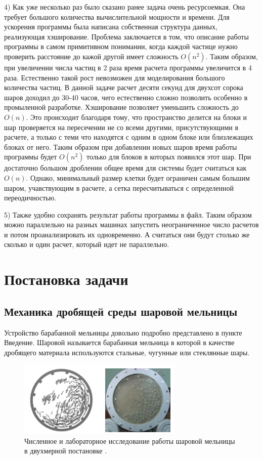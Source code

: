 \documentclass[utf8x, 14pt, oneside, a4paper]{article}
\begin{document}
4) Как уже несколько раз было сказано ранее задача очень ресурсоемкая.
Она требует большого количества вычислительной мощности и времени.
Для ускорения программы была написана собственная структура данных, реализующая хэширование.
Проблема заключается в том, что описание работы программы в самом примитивном понимании, когда каждой частице нужно проверить расстояние до кажой другой имеет сложность $O(n^2)$. 
Таким образом, при увеличении числа частиц в 2 раза время расчета программы увеличится в 4 раза. Естественно такой рост невозможен для моделирования большого количества частиц. 
В данной задаче расчет десяти секунд для двухсот сорока шаров доходил до 30-40 часов, чего естественно сложно позволить особенно в промыленной разработке.
Хэширование позволяет уменьшить сложность до $O(n)$. 
Это происходит благодаря тому, что пространство делится на блоки и шар проверяется на пересечении не со всеми другими, присутствующими в расчете, а только с теми что находятся с одним в одном блоке или близлежащих блоках от него.
Таким образом при добавлении новых шаров время работы программы будет $O(n^2)$ только для блоков в которых появился этот шар.
При достаточно большом дроблении общее время для системы будет считаться как $O(n)$. 
Однако, минимальный размер клетки будет ограничен самым большим шаром, учавствующим в расчете, а сетка пересчитываться с определенной переодичностью. 

5) Также удобно сохранять результат работы программы в файл.
Таким образом можно параллельно на разных машинах запустить неограниченное число расчетов и потом проанализировать их одновременно.
А считаться они будут столько же сколько и один расчет, который идет не параллельно.

		\pagebreak
		

\section{Постановка задачи}

\subsection{Механика дробящей среды шаровой мельницы}

Устройство барабанной мельницы довольно подробно представлено в пункте Введение.
Шаровой называется барабанная мельница в которой в качестве дробящего материала используются стальные, чугунные или стеклянные шары.

\begin{figure}[H]
	\centering
	\includegraphics[width=0.7\textwidth]{wall_2mer} 
	\caption{Численное и лабораторное исследование работы шаровой мельницы в двухмерной постановке \cite{mill_foo}.}
	\label{pic:wall_2mer}
\end{figure} 
\end{document}
